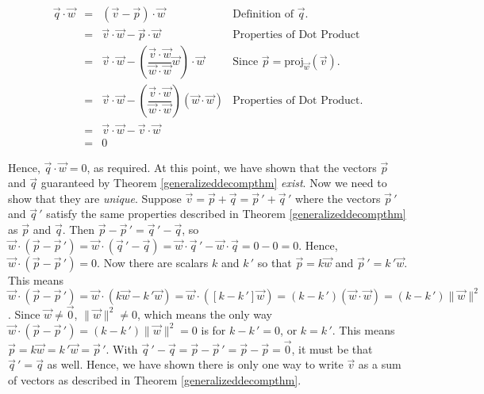\[ \begin{array}{rcll}

\vec{q} \cdot \vec{w} & = & (\vec{v} - \vec{p}) \cdot \vec{w}& \text{Definition of $\vec{q}$.} \\ [3pt]
											& = & \vec{v} \cdot \vec{w} - \vec{p} \cdot \vec{w} & \text{Properties of Dot Product} \\ [8pt]
											& = & \vec{v} \cdot \vec{w} - \left(\dfrac{\vec{v} \cdot \vec{w}}{\vec{w} \cdot \vec{w}} \vec{w}\right) \cdot \vec{w} & \text{Since $\vec{p} = \text{proj}_{\vec{w}}(\vec{v})$.} \\ [8pt]
											& = & \vec{v} \cdot \vec{w} - \left(\dfrac{\vec{v} \cdot \vec{w}}{\vec{w} \cdot \vec{w}}\right) (\vec{w} \cdot \vec{w}) & \text{Properties of Dot Product.} \\ [8pt]
											& = & \vec{v} \cdot \vec{w} - \vec{v}\cdot \vec{w} & \\ [3pt]
											& = & 0 & \end{array} \]
											
Hence, $\vec{q} \cdot \vec{w} = 0$, as required.  At this point, we have shown that the vectors $\vec{p}$ and $\vec{q}$ guaranteed by Theorem \ref{generalizeddecompthm} \textit{exist}.  Now we need to show that they are \textit{unique}.  Suppose $\vec{v} = \vec{p} + \vec{q} = \vec{p} \,' + \vec{q} \,'$ where the vectors $\vec{p} \,'$ and $\vec{q} \,'$ satisfy the same properties described in  Theorem \ref{generalizeddecompthm} as $\vec{p}$ and $\vec{q}$.  Then $\vec{p} - \vec{p} \,' = \vec{q} \,' - \vec{q}$, so $\vec{w} \cdot (\vec{p} - \vec{p} \,') = \vec{w} \cdot (\vec{q} \,' - \vec{q}) = \vec{w} \cdot \vec{q} \,' - \vec{w} \cdot \vec{q} = 0 - 0 = 0$.  Hence, $\vec{w} \cdot (\vec{p} - \vec{p} \,') = 0$.  Now there are scalars $k$ and $k \,'$ so that $\vec{p} = k \vec{w}$ and $\vec{p} \,' = k\,'\vec{w}$. This means  $\vec{w} \cdot (\vec{p} - \vec{p} \,') = \vec{w} \cdot ( k \vec{w} - k \,' \vec{w}) = \vec{w} \cdot ([k - k \,'] \vec{w}) = (k - k \,') (\vec{w} \cdot \vec{w}) = (k - k \,') \| \vec{w} \|^2$.  Since $\vec{w} \neq \vec{0}$, $\| \vec{w} \|^2 \neq 0$, which means the only way $\vec{w} \cdot (\vec{p} - \vec{p} \,') = (k - k \,') \| \vec{w} \|^2  = 0$ is for $k - k \,' = 0$, or $k = k \,'$.  This means $\vec{p} = k \vec{w} = k \,' \vec{w} = \vec{p} \,'$.  With $\vec{q} \,' - \vec{q} = \vec{p} - \vec{p} \,' = \vec{p} - \vec{p} = \vec{0}$, it must be that $\vec{q} \,' = \vec{q}$ as well.  Hence, we have shown there is only one way to write $\vec{v}$ as a sum of vectors as described in Theorem  \ref{generalizeddecompthm}.

